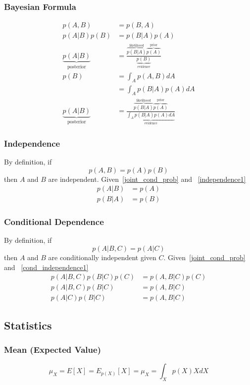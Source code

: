 \documentclass{book}
\numberwithin{equation}{subsection}
\begin{document}
\subsubsection{Bayesian Formula} 
\begin{align}
    p(A,B) &= p(B,A)\\
    p(A|B)p(B) &= p(B|A)p(A)\\
    \underbrace{p(A|B)}_{\text{posterior}} &= \frac{\overbrace{p(B|A)}^\text{likelihood}\overbrace{p(A)}^\text{prior}}{\underbrace{p(B)}_\text{evidence}}\\
    p(B) &= \int_A p(A,B)dA\\
    &= \int_A p(B|A)p(A)dA\\
    \underbrace{p(A|B)}_{\text{posterior}} &= \frac{\overbrace{p(B|A)}^\text{likelihood}\overbrace{p(A)}^\text{prior}}{\underbrace{\int_A p(B|A)p(A)dA}_\text{evidence}}\label{bayesian}
\end{align}
\subsubsection{Independence}
By definition, if
\begin{equation}
    p(A,B) = p(A)p(B) \label{independence1}
\end{equation}
then $A$ and $B$ are independent. Given~\ref{joint_cond_prob} and ~\ref{independence1}
\begin{align}
    p(A|B) &= p(A)\\
    p(B|A) &= p(B)
\end{align}
\subsubsection{Conditional Dependence}
By definition, if
\begin{equation}
    p(A|B,C) = p(A|C) \label{cond_independence1}
\end{equation}
then $A$ and $B$ are conditionally independent given $C$.
Given~\ref{joint_cond_prob} and ~\ref{cond_independence1}
\begin{align}
    p(A|B,C)p(B|C)p(C) &= p(A,B|C)p(C)\\
    p(A|B,C)p(B|C) &= p(A,B|C)\\
    p(A|C)p(B|C) &= p(A,B|C) \label{cond_independence2}
\end{align}
\subsection{Statistics}
\subsubsection{Mean (Expected Value)}
\begin{equation}
    \mu_X = E[X] = E_{p(X)}[X] = \mu_X = \int_X p(X)X dX
\end{equation}
\end{document}
